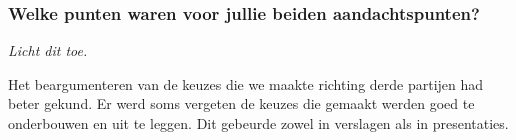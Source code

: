 \documentclass[]{article}
\begin{document}
\subsubsection{Welke punten waren voor jullie beiden aandachtspunten?}
\textit{Licht dit toe.}

Het beargumenteren van de keuzes die we maakte richting derde partijen had beter
gekund. Er werd soms vergeten de keuzes die gemaakt werden goed te onderbouwen
en uit te leggen. Dit gebeurde zowel in verslagen als in presentaties.
\end{document}

